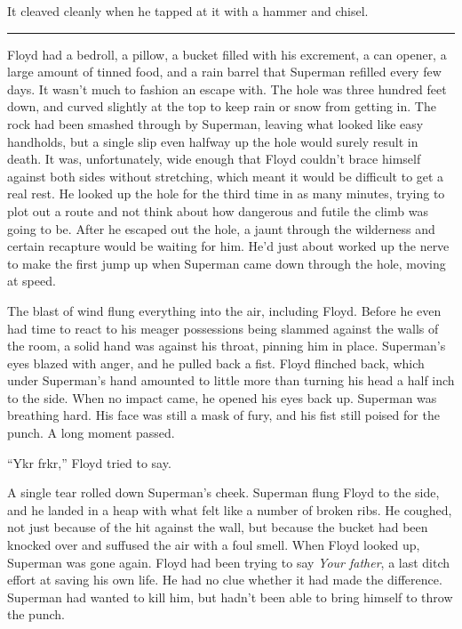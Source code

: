 It cleaved cleanly when he tapped at it with a hammer and chisel.

\begin{center}\rule{0.5\linewidth}{\linethickness}\end{center}

Floyd had a bedroll, a pillow, a bucket filled with his excrement, a can
opener, a large amount of tinned food, and a rain barrel that Superman
refilled every few days. It wasn't much to fashion an escape with. The
hole was three hundred feet down, and curved slightly at the top to keep
rain or snow from getting in. The rock had been smashed through by
Superman, leaving what looked like easy handholds, but a single slip
even halfway up the hole would surely result in death. It was,
unfortunately, wide enough that Floyd couldn't brace himself against
both sides without stretching, which meant it would be difficult to get
a real rest. He looked up the hole for the third time in as many
minutes, trying to plot out a route and not think about how dangerous
and futile the climb was going to be. After he escaped out the hole, a
jaunt through the wilderness and certain recapture would be waiting for
him. He'd just about worked up the nerve to make the first jump up when
Superman came down through the hole, moving at speed.

The blast of wind flung everything into the air, including Floyd. Before
he even had time to react to his meager possessions being slammed
against the walls of the room, a solid hand was against his throat,
pinning him in place. Superman's eyes blazed with anger, and he pulled
back a fist. Floyd flinched back, which under Superman's hand amounted
to little more than turning his head a half inch to the side. When no
impact came, he opened his eyes back up. Superman was breathing hard.
His face was still a mask of fury, and his fist still poised for the
punch. A long moment passed.

``Ykr frkr,'' Floyd tried to say.

A single tear rolled down Superman's cheek. Superman flung Floyd to the
side, and he landed in a heap with what felt like a number of broken
ribs. He coughed, not just because of the hit against the wall, but
because the bucket had been knocked over and suffused the air with a
foul smell. When Floyd looked up, Superman was gone again. Floyd had
been trying to say \emph{Your father}, a last ditch effort at saving his
own life. He had no clue whether it had made the difference. Superman
had wanted to kill him, but hadn't been able to bring himself to throw
the punch.

